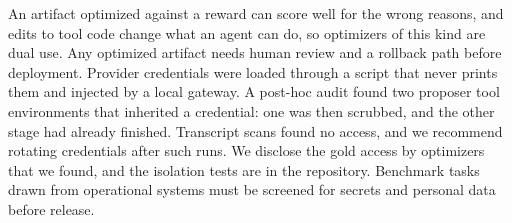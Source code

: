 An artifact optimized against a reward can score well for the wrong reasons, and edits to tool code change what an agent can do, so optimizers of this kind are dual use. Any optimized artifact needs human review and a rollback path before deployment. Provider credentials were loaded through a script that never prints them and injected by a local gateway. A post-hoc audit found two proposer tool environments that inherited a credential: one was then scrubbed, and the other stage had already finished. Transcript scans found no access, and we recommend rotating credentials after such runs. We disclose the gold access by optimizers that we found, and the isolation tests are in the repository. Benchmark tasks drawn from operational systems must be screened for secrets and personal data before release.
